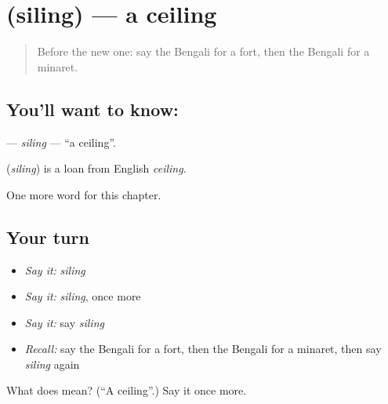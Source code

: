 \section[\texorpdfstring{\bn{সিলিং} (siling)}{সিলিং (siling)}]{ (siling) — a ceiling}

\label{lesson:BN-C158-siling}



\begin{quote}
Before the new one: say the Bengali for a fort, then the Bengali for a minaret.
\end{quote}

\subsection*{You'll want to know: }
\textbf{} — \emph{siling} — \textquotedblleft{}a ceiling\textquotedblright{}.

\begin{cousinweb}
\textbf{} (\emph{siling}) is a loan from English \emph{ceiling}.
\end{cousinweb}

\begin{grammarlens}[title={What you've built}]
One more word for this chapter.
\end{grammarlens}

\subsection*{Your turn}
\begin{itemize}
\raggedright
  \item \emph{Say it:} \emph{siling}
  \item \emph{Say it:} \emph{siling}, once more
  \item \emph{Say it:} say \emph{siling}
  \item \emph{Recall:} say the Bengali for a fort, then the Bengali for a minaret, then say \emph{siling} again
\end{itemize}

\begin{tcolorbox}[breakable,colback=teal!4,colframe=teal!35!black,title={Before you move on}]
What does  mean? (\textquotedblleft{}A ceiling\textquotedblright{}.) Say it once more.
\end{tcolorbox}
